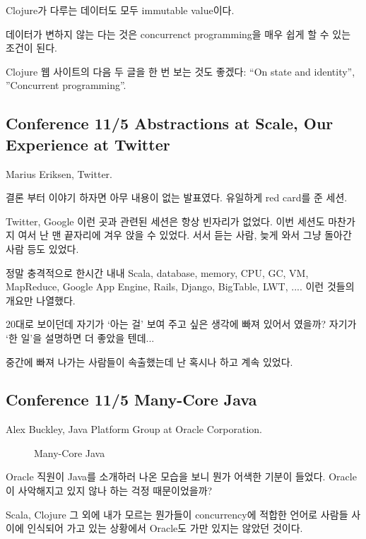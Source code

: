 \documentclass[a4paper]{article}
\begin{document}
Clojure가 다루는 데이터도 모두  immutable value이다. 
 
데이터가 변하지 않는 다는 것은 concurrenct programming을 매우 쉽게 할
수 있는 조건이 된다.
 
Clojure 웹 사이트의 다음 두 글을 한 번 보는 것도 좋겠다:  ``On state and
identity'', ''Concurrent programming''.
 
\subsection{Conference 11/5 Abstractions at Scale, Our Experience at Twitter}
 
Marius Eriksen, Twitter.
 
결론 부터 이야기 하자면 아무 내용이 없는 발표였다. 유일하게 red card를
준 세션.
 
Twitter, Google 이런 곳과 관련된 세션은 항상 빈자리가 없었다. 이번
세션도 마찬가지 여서 난 맨 끝자리에 겨우 앉을 수 있었다. 서서 듣는
사람, 늦게 와서 그냥 돌아간 사람 등도 있었다.
 
정말 충격적으로 한시간 내내 Scala, database, memory, CPU, GC, VM,
MapReduce, Google App Engine, Rails, Django, BigTable, LWT, .... 이런
것들의 개요만 나열했다.
 
20대로 보이던데 자기가 `아는 걸' 보여 주고 싶은 생각에 빠져 있어서
였을까? 자기가 `한 일'을 설명하면 더 좋았을 텐데...
 
중간에 빠져 나가는 사람들이 속출했는데 난 혹시나 하고 계속 있었다. 
 
\subsection{Conference 11/5 Many-Core Java}
 
Alex Buckley, Java Platform Group at Oracle Corporation.

\begin{figure}[t]
    \begin{Frame}
        \begin{center}
        \end{center}
    \end{Frame}
    \caption{Many-Core Java}
    \label{lambda}
\end{figure}

Oracle 직원이 Java를 소개하러 나온 모습을 보니 뭔가 어색한 기분이
들었다. Oracle이 사악해지고 있지 않나 하는 걱정 때문이었을까?
 
Scala, Clojure 그 외에 내가 모르는 뭔가들이 concurrency에 적합한 언어로
사람들 사이에 인식되어 가고 있는 상황에서 Oracle도 가만 있지는 않았던
것이다.
\end{document}
